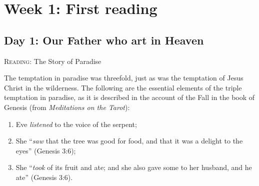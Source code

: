 \section{Week 1: First reading}

\subsection*{Day 1: Our Father who art in Heaven}
\textsc{Reading}: The Story of Paradise

The temptation in paradise was threefold, just as was the temptation of Jesus Christ in the wilderness. The following
are the essential elements of the triple temptation in paradise, as it is described in the account of the Fall in the
book of Genesis (from \emph{Meditations on the Tarot}):

\begin{enumerate}
\item Eve \emph{listened} to the voice of the serpent; 
\item She “\emph{saw} that the tree was good for food, and that it was a delight to the eyes” (Genesis 3:6); 
\item She “\emph{took} of its fruit and ate; and she also gave some to her husband, and he ate” (Genesis 3:6). 
\end{enumerate}

